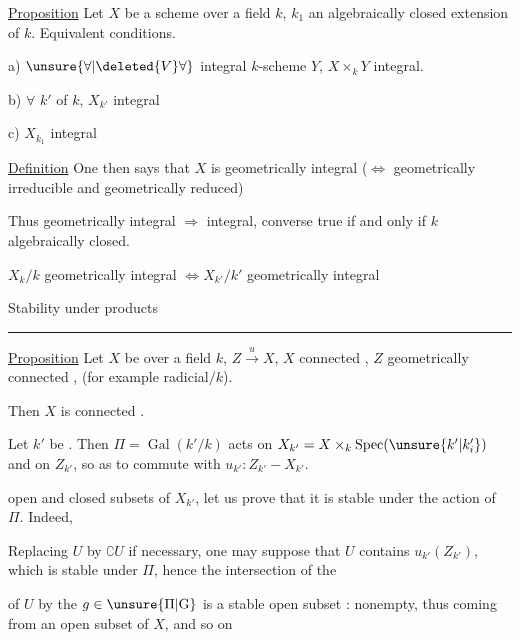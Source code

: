\uline{Proposition} Let $X$ be a scheme over a field $k$, $k_1$ an algebraically closed extension of $k$. Equivalent conditions.

a) $\unsure{\forall|\deleted{V}\forall}$ integral $k$-scheme $Y$, $X\times_k Y$ integral.

b) $\forall$  $k'$ of $k$, $X_{k'}$ integral

c)  $X_{k_1}$ integral

\uline{Definition} One then says that $X$ is geometrically integral ($\Longleftrightarrow$ geometrically irreducible and geometrically reduced)

Thus geometrically integral $\Rightarrow$ integral, converse true if and only if $k$ algebraically closed.

$X_k/k$ geometrically integral $\Longleftrightarrow X_{k'}/k'$ geometrically integral

Stability under products

\par\noindent\rule{.22\linewidth}{.4pt}\par
\uline{Proposition} Let $X$ be over a field $k$, $Z\xrightarrow{u}X$, $X$ connected , $Z$ geometrically connected , (for example  radicial$/k$).

\noindent\vrule\enspace Then $X$ is  connected .

Let $k'$ be  . Then $\Pi=\operatorname{Gal}(k'/k)$ acts on $X_{k'}=X\times_k\operatorname{Spec}(\unsure{k'|k'_i})$ and on $Z_{k'}$, so as to commute with $u_{k'}: Z_{k'} - X_{k'}$.

  open and closed subsets of $X_{k'}$,     let us prove that it is stable under the action of $\Pi$. Indeed,

 Replacing $U$ by $\complement U$ if necessary, one may suppose that $U$ contains $u_{k'}(Z_{k'})$, which is stable under $\Pi$, hence the intersection  of the

  of $U$ by the $g\in \unsure{\Pi|\mathrm{G}}$ is a stable open subset  :  nonempty, thus coming from an open subset  of $X$, and so on


